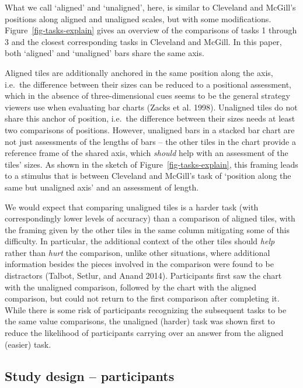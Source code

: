 \documentclass[
]{jds}
\begin{document}
What we call `aligned' and `unaligned', here, is similar to Cleveland
and McGill's positions along aligned and unaligned scales, but with some
modifications. Figure~\ref{fig-tasks-explain} gives an overview of the
comparisons of tasks 1 through 3 and the closest corresponding tasks in
Cleveland and McGill. In this paper, both `aligned' and `unaligned' bars
share the same axis.

Aligned tiles are additionally anchored in the same position along the
axis, i.e.~the difference between their sizes can be reduced to a
positional assessment, which in the absence of three-dimensional cues
seems to be the general strategy viewers use when evaluating bar charts
(Zacks et al. 1998). Unaligned tiles do not share this anchor of
position, i.e.~the difference between their sizes needs at least two
comparisons of positions. However, unaligned bars in a stacked bar chart
are not just assessments of the lengths of bars -- the other tiles in
the chart provide a reference frame of the shared axis, which
\emph{should} help with an assessment of the tiles' sizes. As shown in
the sketch of Figure~\ref{fig-tasks-explain}, this framing leads to a
stimulus that is between Cleveland and McGill's task of `position along
the same but unaligned axis' and an assessment of length.

We would expect that comparing unaligned tiles is a harder task (with
correspondingly lower levels of accuracy) than a comparison of aligned
tiles, with the framing given by the other tiles in the same column
mitigating some of this difficulty. In particular, the additional
context of the other tiles should \emph{help} rather than \emph{hurt}
the comparison, unlike other situations, where additional information
besides the pieces involved in the comparison were found to be
distractors (Talbot, Setlur, and Anand 2014). Participants first saw the
chart with the unaligned comparison, followed by the chart with the
aligned comparison, but could not return to the first comparison after
completing it. While there is some risk of participants recognizing the
subsequent tasks to be the same value comparisons, the unaligned
(harder) task was shown first to reduce the likelihood of participants
carrying over an answer from the aligned (easier) task.

\hypertarget{study-design-participants}{%
\subsection{Study design --
participants}\label{study-design-participants}}
\end{document}
